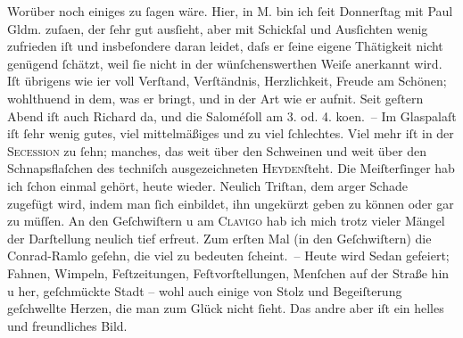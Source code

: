 \pstart
           Worüber noch einiges zu ſagen wäre. Hier, in M.
               bin ich ſeit Donnerſtag mit Paul
                  Gldm. zuſa{\geminationm}en, der ſehr gut ausſieht, aber mit
               Schickſal und Ausſichten wenig zufrieden iſt und insbeſondere daran leidet, daſs er
               ſeine eigene Thätigkeit nicht genügend ſchätzt, weil ſie nicht in der
               wünſchenswerthen Weiſe anerkannt wird. Iſt übrigens wie i{\geminationm}er voll Verſtand, Verſtändnis, Herzlichkeit, Freude am Schönen; wohlthuend in dem,
               was er bringt, und in {\pb}der Art wie er aufni{\geminationm}t. Seit geſtern Abend iſt auch Richard da, und die Saloméſoll am 3. od. 4. ko{\geminationm}en. – Im Glaspalaſt
               iſt ſehr wenig gutes, viel mittelmäßiges und zu viel ſchlechtes. Viel mehr iſt in der
                  \textsc{Secession} zu ſehn; manches, das weit über den Schweinen und weit über den Schnapsflaſchen
               des techniſch ausgezeichneten \textsc{Heyden}ſteht. Die Meiſterſinger hab ich ſchon einmal gehört, heute wieder. Neulich Triſtan, dem arger Schade zugefügt wird, indem
               man ſich einbildet, ihn ungekürzt geben zu können oder gar zu müſſen. An den Geſchwiſtern u am \textsc{Clavigo} hab ich mich trotz vieler Mängel der Darſtellung {\pb}neulich tief erfreut. Zum erſten Mal (in den Geſchwiſtern) die Conrad-Ramlo geſehn,
               die viel zu bedeuten ſcheint. – Heute wird Sedan gefeiert; Fahnen, Wimpeln, Feſtzeitungen, Feſtvorſtellungen, Menſchen
               auf der Straße hin u her, geſchmückte Stadt – wohl auch einige von Stolz und
               Begeiſterung geſchwellte Herzen, die man zum Glück nicht ſieht. Das andre aber iſt
               ein helles und freundliches Bild.\pend
           
